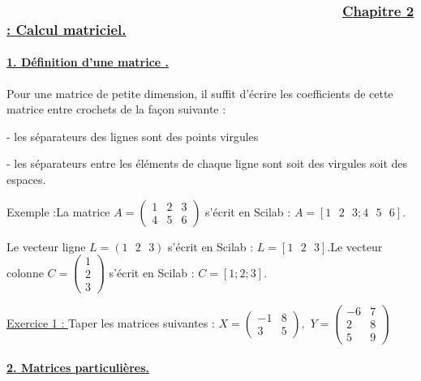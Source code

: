 \documentclass{article}
\begin{document}
\subsubsection{ \ \ \ \ \ \ \ \ \ \ \ \ \ \ \ \ \ \ \ \ \ \ \ \ \ \ \ \ \ \
\ \ \ \ \ \ \ \ \ \ \ \ \ \ \protect\underline{Chapitre 2 : Calcul matriciel.%
}}

\paragraph{\protect\underline{1. D\'{e}finition d'une matrice .}}

Pour une matrice de petite dimension, il suffit d'\'{e}crire les
coefficients de cette matrice entre crochets de la fa\c{c}on suivante :

- les s\'{e}parateurs des lignes sont des points virgules

- les s\'{e}parateurs entre les \'{e}l\'{e}ments de chaque ligne sont soit
des virgules soit des espaces.

Exemple :La matrice $A=\left( 
\begin{array}{ccc}
1 & 2 & 3 \\ 
4 & 5 & 6%
\end{array}%
\right) $ s'\'{e}crit en Scilab : $A=\left[ 1\text{ }2\text{ }3;4\text{ }5%
\text{ }6\right] .$

Le vecteur ligne $L=\left( 1\text{ }2\text{ }3\right) $ s'\'{e}crit en
Scilab : $L=\left[ 1\text{ }2\text{ }3\right] .$Le vecteur colonne $C=\left( 
\begin{array}{c}
1 \\ 
2 \\ 
3%
\end{array}%
\right) $ s'\'{e}crit en Scilab : $C=\left[ 1;2;3\right] .$

\underline{Exercice 1 : }Taper les matrices suivantes : $X=\left( 
\begin{array}{cc}
-1 & 8 \\ 
3 & 5%
\end{array}%
\right) ,$ $Y=\left( 
\begin{array}{cc}
-6 & 7 \\ 
2 & 8 \\ 
5 & 9%
\end{array}%
\right) $

\paragraph{\protect\underline{2. Matrices particuli\`{e}res.}}
\end{document}
